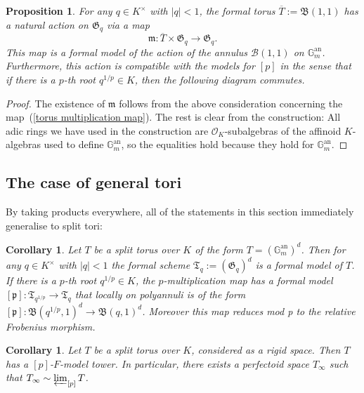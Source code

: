 \documentclass[10pt,oneside]{amsart}
\newtheorem{proposition}[theorem]{Proposition}
\newtheorem{corollary}[theorem]{Corollary}
\theoremstyle{definition}
\theoremstyle{remark}
\begin{document}
	\begin{proposition}\label{action on formal model of torus}
		For any $q\in K^\times$ with $|q|<1$, the formal torus $\overline{T}:=\mathfrak B(1,1)$ has a natural action on $\mathfrak G_q$ via a map
		\[\mathfrak m:\overline{T}\times \mathfrak G_q\rightarrow \mathfrak G_q.\]
		This map is a formal model of the action of the annulus $\mathcal B(1,1)$ on $\mathbb G_m^{\operatorname{an}}$. Furthermore, this action is compatible with the models for $[p]$ in the sense that if there is a $p$-th root $q^{1/p}\in K$, then the following diagram commutes.
		\begin{center}
		\end{center}
	\end{proposition} 
	\begin{proof}
		The existence of $\mathfrak m$ follows from the above consideration concerning the map~(\ref{torus multiplication map}). The rest is clear from the construction: All adic rings we have used in the construction are $\mathcal O_K$-subalgebras of the affinoid $K$-algebras used to define $\mathbb G_m^{\operatorname{an}}$, so the equalities hold because they hold for $\mathbb G_m^{\operatorname{an}}$.
	\end{proof}
	
	\subsection{The case of general tori}
	By taking products everywhere, all of the statements in this section immediately generalise to split tori:
	\begin{corollary}\label{torus has formal models}
		Let $T$ be a split torus over $K$ of the form $T=(\mathbb G_m^{\operatorname{an}})^d$. Then for any $q\in K^\times$ with $|q|<1$ the formal scheme $\mathfrak T_q := (\mathfrak G_q)^d$ is a formal model of $T$. If there is a $p$-th root $q^{1/p}\in K$, the $p$-multiplication map has a formal model $[\mathfrak p]:\mathfrak T_{q^{1/p}}\rightarrow \mathfrak T_{q}$ that locally on polyannuli is of the form $[\mathfrak p]:\mathfrak B(q^{1/p},1)^d\rightarrow \mathfrak B(q,1)^d$. Moreover this map reduces mod p to the relative Frobenius morphism.
	\end{corollary}
	\begin{corollary}\label{torus has p-F-model tower and has perfectoid tilde-limit}
		Let $T$ be a split torus over $K$, considered as a rigid space. Then $T$ has a $[p]$-$F$-model tower. In particular, there exists a perfectoid space $T_\infty$ such that $T_\infty \sim \varprojlim_{[p]} T$. 
	\end{corollary}
	
\end{document}
